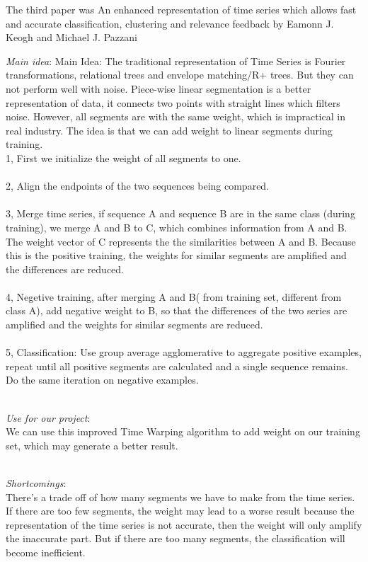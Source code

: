 The third paper was An enhanced representation of time series which allows fast and accurate classification, clustering and relevance feedback by Eamonn J. Keogh and Michael J. Pazzani 
\begin{itemize*}
\item {\em Main idea}:
Main Idea: The traditional representation of Time Series is Fourier transformations, relational trees  and envelope matching/R+ trees. But they can not perform well with noise. Piece-wise linear segmentation is a better representation of data, it connects two points with straight lines which filters noise. However, all segments are with the same weight, which is impractical in real industry. The idea is that we can add weight to linear segments during training.\\

1, First we initialize the weight of all segments to one. \\\\
2, Align the endpoints of the two sequences being compared.\\\\
3, Merge time series, if sequence A and sequence B are in the same class (during training), we merge A and B to C, which combines information from A and B. The weight vector of C represents the the similarities between A and B.  Because this is the positive training, the weights for similar segments are amplified and the differences are reduced. \\\\
4, Negetive training, after merging A and B( from training set, different from class A), add negative weight to B, so that the differences of the two series are amplified and the weights for similar segments are reduced.\\\\
5, Classification: Use group average agglomerative to aggregate positive examples, repeat until all positive segments are calculated and a single sequence remains. Do the same iteration on negative examples. \\\\
\item {\em Use for our project}:\\
We can use this improved Time Warping algorithm to add weight on our training set, which may generate a better result.\\\\
\item {\em Shortcomings}:\\
There's a trade off of how many segments we have to make from the time series. If there are too few segments, the weight may lead to a worse result because the representation of the time series is not accurate, then the weight will only amplify the inaccurate part. But if there are too many segments, the classification will become inefficient. 

\end{itemize*}

